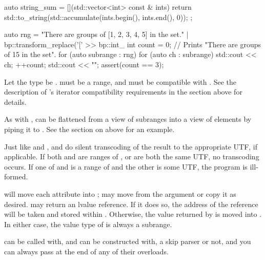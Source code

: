 \documentclass{MyBook}
\begin{document}
\begin{code}
auto string_sum = [](std::vector<int> const & ints) {
    return std::to_string(std::accumulate(ints.begin(), ints.end(), 0));
};

auto rng = "There are groups of [1, 2, 3, 4, 5] in the set." |
           bp::transform_replace('[' >> bp::int_ %
int count = 0;
// Prints "There are groups of 15 in the set".
for (auto subrange : rng) {
    for (auto ch : subrange) {
        std::cout << ch;
    }
    ++count;
}
std::cout << "\n";
assert(count == 3);
\end{code}

Let the type  be .  must be a range, and must be compatible with . See the description of 's iterator compatibility requirements in the section above for details.

As with ,  can be flattened from a view of subranges into a view of elements by piping it to . See the section on  above for an example.

Just like  and ,  and  do silent transcoding of the result to the appropriate UTF, if applicable. If both  and  are ranges of , or are both the same UTF, no transcoding occurs. If one of  and  is a range of  and the other is some UTF, the program is ill-formed.

 will move each attribute into ;  may move from the argument or copy it as desired.  may return an lvalue reference. If it does so, the address of the reference will be taken and stored within . Otherwise, the value returned by  is moved into . In either case, the value type of  is always a subrange.

 can be called with, and  can be constructed with, a skip parser or not, and you can always pass  at the end of any of their overloads.
\end{document}
